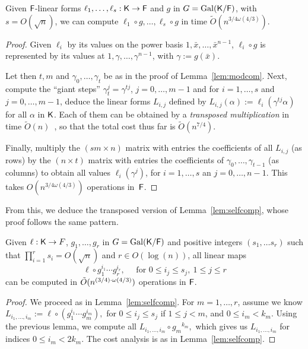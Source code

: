 \begin{lemma}\label{lem:modcomT}
  Given ${\mathsf{F}}$-linear forms $\ell_1,\dots,\ell_s:{\mathsf{K}}\to {\mathsf{F}}$ and $g$ in $G =
  \mathrm{Gal}({\mathsf{K}}/{\mathsf{F}})$, with $s = O(\sqrt{n})$, we can compute
  $\ell_1\circ g,\dots,\ell_s \circ g$ in time $\tilde
  O(n^{{3}/{4}\omega({4}/{3})})$.
\end{lemma}
\begin{proof}
  Given $\ell_i$ by its values on the power basis $1,\bar x,\dots,\bar
  x^{n-1}$, $\ell_i \circ g$ is represented by its values at
  $1,\gamma,\dots,\gamma^{n-1}$, with $\gamma := g(\bar x)$. 

  Let then $t,m$ and $\gamma_0,\dots,\gamma_t$ be as in the proof of
  Lemma~\ref{lem:modcom}. Next, compute the ``giant steps''
  $\gamma_t^j = \gamma^{tj}$, $j=0,\dots,m-1$ and for $i=1,\dots,s$
  and $j=0,\dots,m-1$, deduce the linear forms $L_{i,j}$ defined by
  $L_{i,j}(\alpha) := \ell_i(\gamma^{tj}\alpha)$ for all $\alpha$ in
  ${\mathsf{K}}$. Each of them can be obtained by a {\em transposed
    multiplication} in time $\tilde{O}(n)$~\cite[Section~4.1]{Shoup},
  so that the total cost thus far is $\tilde{O}(n^{7/4})$.

  Finally, multiply the $(sm \times
  n)$ matrix with entries the coefficients of all $L_{i,j}$ (as rows)
  by the $(n \times t)$ matrix with entries the coefficients of
  $\gamma_0,\dots,\gamma_{t-1}$ (as columns) to obtain all values
  $\ell_i(\gamma^j)$, for $i=1,\dots,s$ an $j=0,\dots,n-1$.
  This takes $O(n^{{3}/{4}\omega({4}/{3})})$ operations in~${\mathsf{F}}$.
\end{proof}

From this, we deduce the transposed version of Lemma~\ref{lem:selfcomp},
whose proof follows the same pattern.
\begin{lemma}\label{lem:transmodcomp}
Given $\ell:{\mathsf{K}}\to F$, $g_1, \ldots , g_{r}$ in $G =
\mathrm{Gal}({\mathsf{K}}/{\mathsf{F}})$ and positive integers $(s_1, \ldots s_r)$ such
that $\prod_{i = 1}^r s_i = O(\sqrt{n})$ and $r \in O(\log(n))$, all
linear maps
  $$\ell \circ g_1^{i_1}\cdots g_r^{i_r} ,\quad \text{~for~} 0 \leq i_j
\leq s_j,\ 1 \leq j \leq r$$ can be computed in $\tilde{O}(n^{(3/4)\cdot \omega(4/3)})$
operations in ${\mathsf{F}}$.
\end{lemma} 
\begin{proof}
  We proceed as in Lemma~\ref{lem:selfcomp}. For $m=1,\dots,r$, assume
  we know $L_{i_1,\dots,i_m}:=\ell \circ (g_1^{i_1}\cdots g_m^{i_m}),$
  for $0 \leq i_j \leq s_j$ if $1 \leq j < m$, and $0 \leq i_m < k_m.$
  Using the previous lemma, we compute all $L_{i_1,\dots,i_m} \circ
  {g_m}^{k_m},$ which gives us $L_{i_1,\dots,i_m}$ for indices $0 \le
  i_m < 2k_m$. The cost analysis is as in Lemma~\ref{lem:selfcomp}.
\end{proof}

